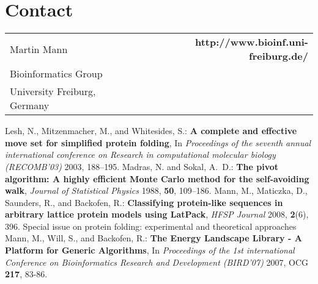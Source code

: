\documentclass{article}
\begin{document}
\section{Contact}

\begin{tabular}{lcr}
	Martin Mann  && \bfseries http://www.bioinf.uni-freiburg.de/\\
	Bioinformatics Group\\
	University Freiburg, Germany \\
\end{tabular}





\begin{thebibliography}{99}
 {
	Lesh, N., Mitzenmacher, M., and Whitesides, S.:
	{\bfseries A complete and effective move set for simplified protein folding},
	In \emph{Proceedings of the seventh annual international conference
	  on Research in computational molecular biology (RECOMB'03)} 2003,
	 188--195.
	}
 {
	Madras, N. and Sokal, A.~D.:
	{\bfseries The pivot algorithm: A highly efficient {Monte Carlo} method for the
	  self-avoiding walk},
	\emph{Journal of Statistical Physics} 1988,
	{\bfseries 50}, 109--186.
	}
 {
	Mann, M., Maticzka, D., Saunders, R., and Backofen, R.:
	{\bfseries Classifying protein-like sequences in arbitrary lattice protein models using {LatPack}},
	\emph{HFSP Journal} 2008,
	{\bfseries 2}(6), 396.
	Special issue on protein folding: experimental and theoretical approaches
	}
 {
	Mann, M., Will, S., and Backofen, R.:
	{\bfseries The Energy Landscape Library - A Platform for Generic Algorithms},
	In \emph{Proceedings of the 1st international Conference on Bioinformatics 
	Research and Development (BIRD'07)} 2007,
	OCG {\bfseries 217}, 83-86.
	}


\end{thebibliography}
 
\end{document}

